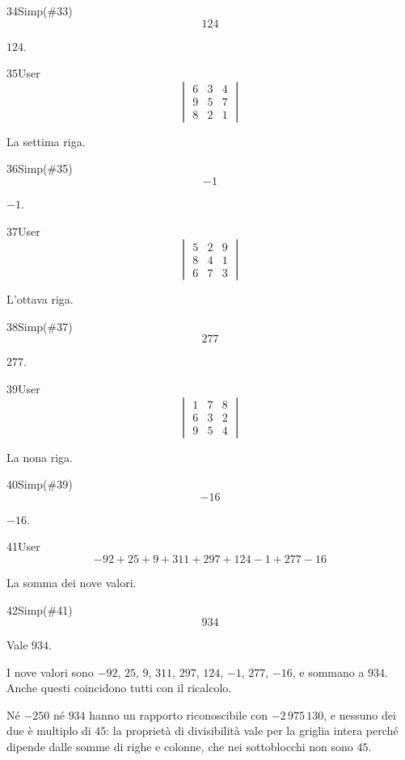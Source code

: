 \begin{espr}{34}{Simp(\#33)}{}
\[
124
\]
\end{espr}
$124$.

\begin{espr}{35}{User}{}
\[
\begin{vmatrix} 6 & 3 & 4 \\ 9 & 5 & 7 \\ 8 & 2 & 1 \end{vmatrix}
\]
\end{espr}
La settima riga.

\begin{espr}{36}{Simp(\#35)}{}
\[
-1
\]
\end{espr}
$-1$.

\begin{espr}{37}{User}{}
\[
\begin{vmatrix} 5 & 2 & 9 \\ 8 & 4 & 1 \\ 6 & 7 & 3 \end{vmatrix}
\]
\end{espr}
L'ottava riga.

\begin{espr}{38}{Simp(\#37)}{}
\[
277
\]
\end{espr}
$277$.

\begin{espr}{39}{User}{}
\[
\begin{vmatrix} 1 & 7 & 8 \\ 6 & 3 & 2 \\ 9 & 5 & 4 \end{vmatrix}
\]
\end{espr}
La nona riga.

\begin{espr}{40}{Simp(\#39)}{}
\[
-16
\]
\end{espr}
$-16$.

\begin{espr}{41}{User}{}
\[
-92 + 25 + 9 + 311 + 297 + 124 - 1 + 277 - 16
\]
\end{espr}
La somma dei nove valori.

\begin{espr}{42}{Simp(\#41)}{}
\[
934
\]
\end{espr}
Vale $934$.


I nove valori sono $-92$, $25$, $9$, $311$, $297$, $124$, $-1$, $277$, $-16$, e sommano a $934$. Anche questi coincidono tutti con il ricalcolo.

Né $-250$ né $934$ hanno un rapporto riconoscibile con $-2\,975\,130$, e nessuno dei due è multiplo di $45$: la proprietà di divisibilità vale per la griglia intera perché dipende dalle somme di righe e colonne, che nei sottoblocchi non sono $45$.

